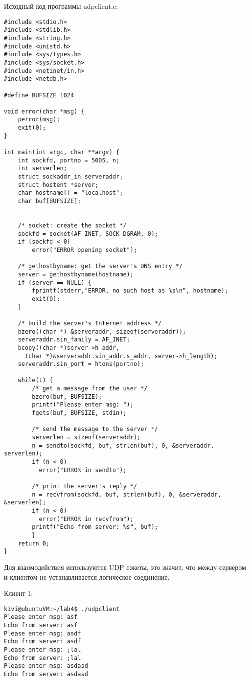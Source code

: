 \documentclass[a4paper]{article}
\begin{document}
	Исходный код программы udpclient.c:
	\begin{lstlisting}[style=crs_cpp]
#include <stdio.h>
#include <stdlib.h>
#include <string.h>
#include <unistd.h>
#include <sys/types.h>
#include <sys/socket.h>
#include <netinet/in.h>
#include <netdb.h> 

#define BUFSIZE 1024

void error(char *msg) {
    perror(msg);
    exit(0);
}

int main(int argc, char **argv) {
    int sockfd, portno = 5005, n;
    int serverlen;
    struct sockaddr_in serveraddr;
    struct hostent *server;
    char hostname[] = "localhost";
    char buf[BUFSIZE];


    /* socket: create the socket */
    sockfd = socket(AF_INET, SOCK_DGRAM, 0);
    if (sockfd < 0) 
        error("ERROR opening socket");

    /* gethostbyname: get the server's DNS entry */
    server = gethostbyname(hostname);
    if (server == NULL) {
        fprintf(stderr,"ERROR, no such host as %s\n", hostname);
        exit(0);
    }

    /* build the server's Internet address */
    bzero((char *) &serveraddr, sizeof(serveraddr));
    serveraddr.sin_family = AF_INET;
    bcopy((char *)server->h_addr, 
	  (char *)&serveraddr.sin_addr.s_addr, server->h_length);
    serveraddr.sin_port = htons(portno);

    while(1) {
		/* get a message from the user */
		bzero(buf, BUFSIZE);
		printf("Please enter msg: ");
		fgets(buf, BUFSIZE, stdin);

		/* send the message to the server */
		serverlen = sizeof(serveraddr);
		n = sendto(sockfd, buf, strlen(buf), 0, &serveraddr, serverlen);
		if (n < 0) 
		  error("ERROR in sendto");
	
		/* print the server's reply */
		n = recvfrom(sockfd, buf, strlen(buf), 0, &serveraddr, &serverlen);
		if (n < 0) 
		  error("ERROR in recvfrom");
		printf("Echo from server: %s", buf);
	    }
    return 0;
}
	\end{lstlisting}
	
	Для взаимодействия используются UDP сокеты, это значит, что между сервером и клиентом не устанавливается логическое соединение.
	
	Клиент 1:
	\begin{lstlisting}[style=crs_bash]
kivi@ubuntuVM:~/lab4$ ./udpclient 
Please enter msg: asf
Echo from server: asf
Please enter msg: asdf
Echo from server: asdf
Please enter msg: ;lal
Echo from server: ;lal
Please enter msg: asdasd
Echo from server: asdasd
	\end{lstlisting}
	
\end{document}
